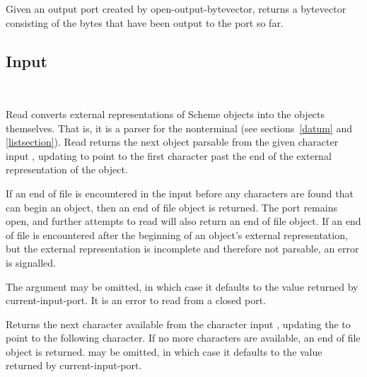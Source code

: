 \begin{entry}{%
}

Given an output port created by {\cf open-output-bytevector}, returns a
bytevector consisting of the bytes that have been output to the port
so far.
\end{entry}


\subsection{Input}
\label{inputsection}

\noindent \hbox{ }  %
\vspace{-5ex}

\begin{entry}{%
}

{\cf Read} converts external representations of Scheme objects into the
objects themselves.  That is, it is a parser for the nonterminal
 (see sections~\ref{datum} and
\ref{listsection}).  {\cf Read} returns the next
object parsable from the given character input , updating
 to point to
the first character past the end of the external representation of the object.

\vest If an end of file is encountered in the input before any
characters are found that can begin an object, then an end of file
object is returned.  \todo{} The port remains open, and further attempts
to read will also return an end of file object.  If an end of file is
encountered after the beginning of an object's external representation,
but the external representation is incomplete and therefore not parsable,
an error is signalled.

The  argument may be omitted, in which case it defaults to the
value returned by {\cf current-input-port}.  It is an error to read from
a closed port.
\end{entry}

\begin{entry}{%
}

Returns the next character available from the character input ,
updating
the  to point to the following character.  If no more characters
are available, an end of file object is returned.   may be
omitted, in which case it defaults to the value returned by {\cf current-input-port}.

\end{entry}

